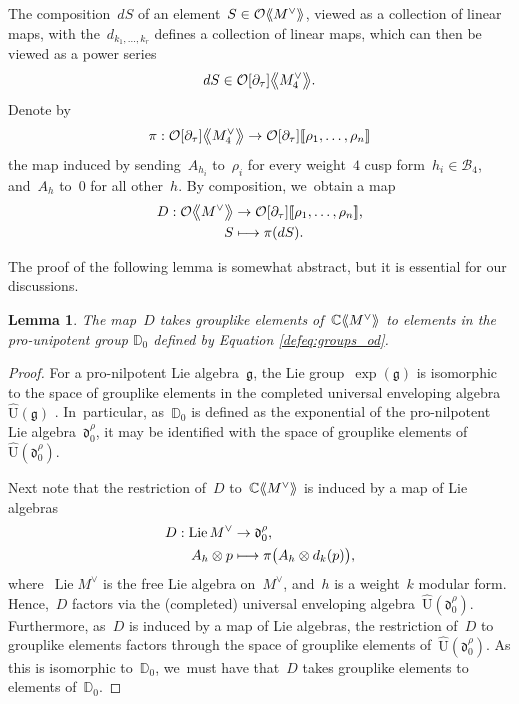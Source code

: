 \documentclass[JEP,XML,SOM,Unicode,published]{cedram}
\newcommand\mto{\mathchoice{\longmapsto}{\mapsto}{\mapsto}{\mapsto}}
\theoremstyle{plain}
\newtheorem{lemma}[theoremcounter]{Lemma}
\theoremstyle{definition}
\newcommand{\tx}{\text}
\newcommand{\bbC}{\ensuremath{\mathbb{C}}}
\newcommand{\bbD}{\ensuremath{\mathbb{D}}}
\newcommand{\cB}{\ensuremath{\mathcal{B}}}
\newcommand{\cO}{\ensuremath{\mathcal{O}}}
\newcommand{\frakd}{\ensuremath{\mathfrak{d}}}
\newcommand{\frakg}{\ensuremath{\mathfrak{g}}}
\newcommand{\rmU}{\ensuremath{\mathrm{U}}}
\newcommand{\llbrkt}{[\![}
\newcommand{\rrbrkt}{]\!]}
\DeclareMathOperator{\Lie}{Lie}
\newcommand{\llangle}{\mathopen{\langle\mspace{-4mu}\langle}}
\newcommand{\rrangle}{\mathclose{\rangle\mspace{-4mu}\rangle}}
\newcommand{\bigllangle}{\mathopen{\big\langle\mspace{-5mu}\big\langle}}
\newcommand{\bigrrangle}{\mathclose{\big\rangle\mspace{-5mu}\big\rangle}}
\begin{document}
The composition~$dS$ of an element~$S\in \cO\llangle M^{\vee}\rrangle$, viewed as a collection of linear maps, with the~$d_{k_1,\ldots,k_r}$ defines a collection of linear maps, which can then be viewed as a power series
\begin{equation*}
dS \in \cO[\partial_\tau] \bigllangle M_4^\vee \bigrrangle
\tx{.}
\end{equation*}
Denote by
\begin{equation*}
\pi :
\cO[\partial_\tau] \bigllangle M_4^\vee \bigrrangle
\to
\cO[\partial_\tau]\llbrkt\rho_1,\ldots,\rho_n\rrbrkt
\end{equation*}
the map induced by sending~$A_{h_i}$ to~$\rho_i$ for every weight~$4$ cusp form~$h_i\in \cB_4$, and~$A_h$ to~$0$ for all other~$h$. By composition, we~obtain a map
\begin{equation}
\label{defeq:motivic-projection}
\begin{aligned}
D: \cO\bigllangle M^\vee \bigrrangle
&\to
\cO[\partial_\tau] \llbrkt \rho_1,\ldots,\rho_n\rrbrkt
\tx{,}\\
S
&\mto
\pi(dS)
\tx{.}
\end{aligned}
\end{equation}

The proof of the following lemma is somewhat abstract, but it is essential for our discussions.

\begin{lemma}\label{lem:motivic-series-in-o}
The map~$D$ takes grouplike elements of\/~$\bbC\llangle M^\vee \rrangle$ to elements in the pro-unipotent group $\bbD_0$ defined by Equation \eqref{defeq:groups_od}.
\end{lemma}

\begin{proof}
For a pro-nilpotent Lie algebra~$\frakg$, the Lie group~$\exp(\frakg)$ is isomorphic to the space of grouplike elements in the completed universal enveloping algebra~$\widehat{\rmU}(\frakg)$ \cite{abe2004hopf}. In~particular, as~$\bbD_0$ is defined as the exponential of the pro-nilpotent Lie algebra~$\frakd_0^\rho$, it may be identified with the space of grouplike elements of~$\widehat{\rmU}(\frakd_0^\rho)$.

Next note that the restriction of~$D$ to~$\bbC\llangle M^\vee \rrangle$ is induced by a map of Lie algebras
\begin{equation}
\begin{aligned}
D:\Lie M^\vee &\to \frakd_0^\rho\tx{,}\\
A_h\otimes p &\mto \pi\bigl(A_h\otimes d_k(p) \bigr)
\tx{,}
\end{aligned}
\end{equation}
where~$\Lie M^\vee$ is the free Lie algebra on~$M^\vee$, and~$h$ is a weight~$k$ modular form. Hence,~$D$ factors via the (completed) universal enveloping algebra~$\widehat{\rmU}(\frakd_0^\rho)$. Furthermore, as~$D$ is induced by a map of Lie algebras, the restriction of~$D$ to grouplike elements factors through the space of grouplike elements of~$\widehat{\rmU}(\frakd_0^\rho)$. As this is isomorphic to~$\bbD_0$, we~must have that~$D$ takes grouplike elements to elements of~$\bbD_0$.
\end{proof}
\end{document}
